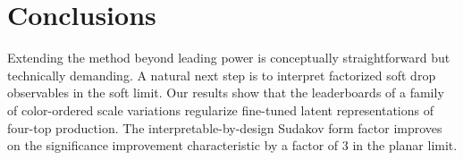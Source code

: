 \section{Conclusions}\label{sec:conclusions}

Extending the method beyond leading power is conceptually
straightforward but technically demanding. A natural next step is to
interpret factorized soft drop observables in the soft limit. Our
results show that the leaderboards of a family of color-ordered scale
variations regularize fine-tuned latent representations of four-top
production. The interpretable-by-design Sudakov form factor improves on
the significance improvement characteristic by a factor of 3 in the
planar limit.

